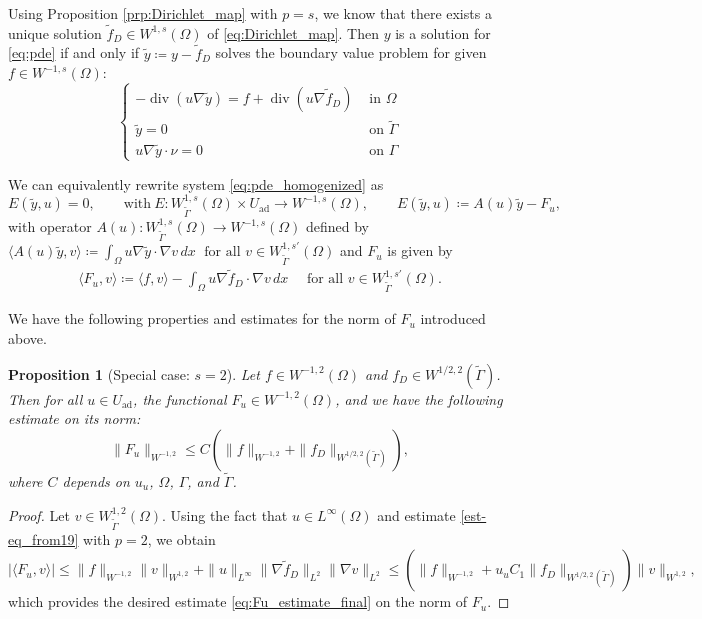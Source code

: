 \documentclass[11pt]{article}
\DeclareMathOperator*{\dvg}{div}
\newcommand{\feas}{U_{\textrm{ad}}}
\newtheorem{proposition}[theorem]{Proposition}
\theoremstyle{definition}
\theoremstyle{remark}
\begin{document}
Using Proposition \cref{prp:Dirichlet_map} with $p = s$, we know that there exists a unique solution $\tilde f_D \in   W^{1,s}(\Omega)$ of \eqref{eq:Dirichlet_map}. 
Then $y$ is a solution for \eqref{eq:pde} if and only if 
$\displaystyle \tilde y \coloneqq y - \tilde f_D$ solves the boundary value problem for given $f \in W^{-1,s}(\Omega)$:
\begin{equation}\label{eq:pde_homogenized}
    \begin{cases}
- \dvg(u \nabla \tilde y)
= f + \dvg(u\nabla \tilde f_D)
& \text{ in }\Omega\\
\tilde y = 0
&\text{ on }\tilde\Gamma\\
u \nabla \tilde y\cdot\nu
= 0
&\text{ on }\Gamma
    \end{cases}
\end{equation}

We can equivalently rewrite system  \eqref{eq:pde_homogenized}  
as
\[ E(\tilde y,u)=0, \qquad \text{with} \ 
E:W^{1,s}_{\tilde\Gamma}(\Omega)\times \feas\to W^{-1,s}(\Omega), \qquad
E(\tilde y,u)\coloneqq A(u)\tilde y - F_u,
\]
with  operator $A(u) : W^{1,s}_{\tilde\Gamma}(\Omega) \to W^{-1,s}(\Omega)$
 defined by $
\langle A(u)\tilde y , v\rangle
\coloneqq \int_\Omega u\nabla \tilde y\cdot\nabla v\,dx
\; \text{ for all }v \in W^{1,s'}_{\tilde\Gamma}(\Omega)
$
%
and $F_u$ is given by
%
\begin{gather}\label{eq:Fu_definition}
\langle F_u , v\rangle
\coloneqq
\langle f, v\rangle
- \int_\Omega u\nabla\tilde f_D\cdot\nabla v\,dx
\quad\text{ for all }v \in W^{1,s'}_{\tilde\Gamma}(\Omega).
\end{gather}

We have the following properties and estimates for the norm of $F_u$ introduced above. 

\begin{proposition}[Special case: $s = 2$]\label{prop:Fu_bound}
Let $f \in W^{-1,2}(\Omega)$ and $f_D \in W^{1/2,2}(\tilde{\Gamma})$.  
Then for all $u \in \feas$, the functional $F_u \in  W^{-1,2}(\Omega)$, and we have the following estimate on its norm:
%
\begin{equation}\label{eq:Fu_estimate_final}
\|F_u\|_{W^{-1,2}}
\le C(\|f\|_{W^{-1,2}}
+ \|f_D\|_{W^{1/2,2}(\tilde\Gamma)}),
\end{equation}
%
where $C$ depends on $u_u$, $\Omega$, $\Gamma$, and $\tilde{\Gamma}$.
\end{proposition}
\begin{proof}
Let $v\in W^{1,2}_{\tilde\Gamma}(\Omega)$. Using the fact that $u\in L^\infty(\Omega)$ and estimate \eqref{est-eq_from19} with $p=2$, we obtain
\[ |\langle F_u , v\rangle | \leq \|f\|_{W^{-1,2}}\|v\|_{W^{1,2}}+ 
\|u\|_{L^\infty}\|\nabla\tilde f_D\|_{L^2}\|\nabla v\|_{L^2}
\le (\|f\|_{W^{-1,2}} +
u_uC_1 \|f_D\|_{W^{1/2,2}(\tilde\Gamma)})\|v\|_{W^{1,2}},
\]
which provides the desired estimate  \eqref{eq:Fu_estimate_final} on the norm of $F_u$.
\end{proof}
\end{document}
